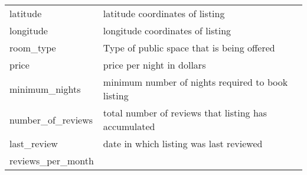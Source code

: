 \begin{longtable}[]{@{}ll@{}}
\begin{minipage}[t]{0.25\columnwidth}
latitude\strut
\end{minipage} & \begin{minipage}[t]{0.69\columnwidth}\raggedright
latitude coordinates of listing\strut
\end{minipage}\tabularnewline
\begin{minipage}[t]{0.25\columnwidth}\raggedright
longitude\strut
\end{minipage} & \begin{minipage}[t]{0.69\columnwidth}\raggedright
longitude coordinates of listing\strut
\end{minipage}\tabularnewline
\begin{minipage}[t]{0.25\columnwidth}\raggedright
room\_type\strut
\end{minipage} & \begin{minipage}[t]{0.69\columnwidth}\raggedright
Type of public space that is being offered\strut
\end{minipage}\tabularnewline
\begin{minipage}[t]{0.25\columnwidth}\raggedright
price\strut
\end{minipage} & \begin{minipage}[t]{0.69\columnwidth}\raggedright
price per night in dollars\strut
\end{minipage}\tabularnewline
\begin{minipage}[t]{0.25\columnwidth}\raggedright
minimum\_nights\strut
\end{minipage} & \begin{minipage}[t]{0.69\columnwidth}\raggedright
minimum number of nights required to book listing\strut
\end{minipage}\tabularnewline
\begin{minipage}[t]{0.25\columnwidth}\raggedright
number\_of\_reviews\strut
\end{minipage} & \begin{minipage}[t]{0.69\columnwidth}\raggedright
total number of reviews that listing has accumulated\strut
\end{minipage}\tabularnewline
\begin{minipage}[t]{0.25\columnwidth}\raggedright
last\_review\strut
\end{minipage} & \begin{minipage}[t]{0.69\columnwidth}\raggedright
date in which listing was last reviewed\strut
\end{minipage}\tabularnewline
\begin{minipage}[t]{0.25\columnwidth}\raggedright
reviews\_per\_month\strut

\end{minipage}
\end{longtable}
